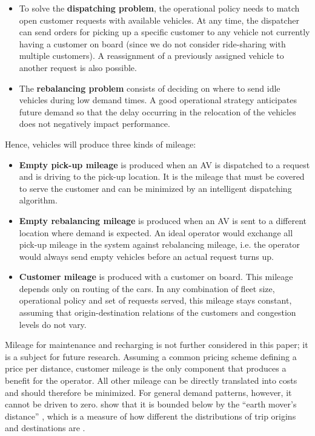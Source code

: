 \begin{itemize}
\item To solve the \textbf{dispatching problem}, the operational policy needs to match open customer requests with available vehicles. At any time, the dispatcher can send orders for picking up a specific customer to any vehicle not currently having a customer on board (since we do not consider ride-sharing with multiple customers). A reassignment of a previously assigned vehicle to another request is also possible.

\item The \textbf{rebalancing problem} consists of deciding on where to send idle vehicles during low demand times. A good operational strategy anticipates future demand so that the delay occurring in the relocation of the vehicles does not negatively impact performance.
\end{itemize}

Hence, vehicles will produce three kinds of mileage:

\begin{itemize}
\item \textbf{Empty pick-up mileage} is produced when an AV is dispatched to a request and is driving to the pick-up location. It is the mileage that must be covered to serve the customer and can be minimized by an intelligent dispatching algorithm.

\item \textbf{Empty rebalancing mileage} is produced when an AV is sent to a different location where demand is expected. An ideal operator would exchange all pick-up mileage in the system against rebalancing mileage, i.e. the operator would always send empty vehicles before an actual request turns up.

\item \textbf{Customer mileage} is produced with a customer on board. This mileage depends only on routing of the cars. In any combination of fleet size, operational policy and set of requests served, this mileage stays constant, assuming that origin-destination relations of the customers and congestion levels do not vary.

\end{itemize}

Mileage for maintenance and recharging is not further considered in this paper; it is a subject for future research. Assuming a common pricing scheme defining a price per distance, customer mileage is the only component that produces a benefit for the operator. All other mileage can be directly translated into costs and should therefore be minimized. For general demand patterns, however, it cannot be driven to zero.  \citet{spieser2014toward} show that it is bounded below by the ``earth mover's distance'' \citep{levina2001earth}, which is a measure of how different the distributions of trip origins and destinations are \citep{ruschendorf1985wasserstein}.

